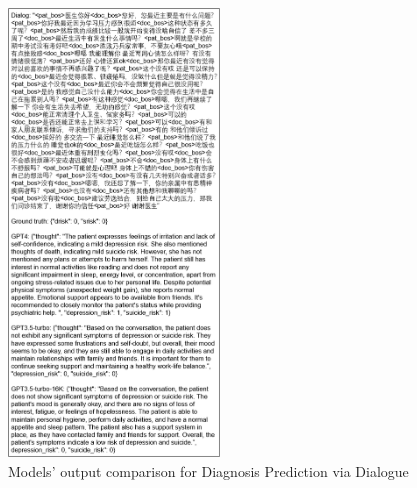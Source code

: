 \begin{figure}[htpb]
    \centering
    \includegraphics[width=0.5\textwidth]{Figure/D4_example1.png}
    \caption{Models' output comparison for Diagnosis Prediction via Dialogue}
\end{figure}

